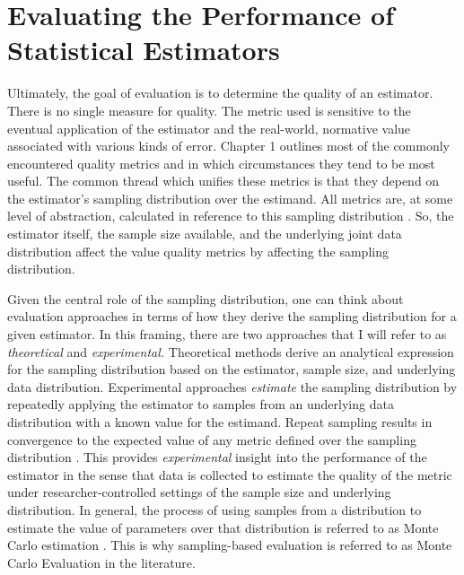 \documentclass[../main.tex]{subfiles}
\begin{document}
\section{Evaluating the Performance of Statistical Estimators}

\vspace{\baselineskip}
Ultimately, the goal of evaluation is to determine the quality of an estimator. There is no single measure for quality. The metric used is sensitive to the eventual application of the estimator and the real-world, normative value associated with various kinds of error. \cite{Bishop2006PatternLearning} Chapter 1 outlines most of the commonly encountered quality metrics and in which circumstances they tend to be most useful. The common thread which unifies these metrics is that they depend on the estimator's sampling distribution over the estimand. All metrics are, at some level of abstraction, calculated in reference to this sampling distribution \cite{Calder1953StatisticalInference}. So, the estimator itself, the sample size available, and the underlying joint data distribution affect the value quality metrics by affecting the sampling distribution.\par


\vspace{\baselineskip}
Given the central role of the sampling distribution, one can think about evaluation approaches in terms of how they derive the sampling distribution for a given estimator. In this framing, there are two approaches that I will refer to as \textit{theoretical} and \textit{experimental.} Theoretical methods derive an analytical expression for the sampling distribution based on the estimator, sample size, and underlying data distribution. Experimental approaches \textit{estimate }the sampling distribution by repeatedly applying the estimator to samples from an underlying data distribution with a known value for the estimand. Repeat sampling results in convergence to the expected value of any metric defined over the sampling distribution \cite{Paxton2001MonteImplementation}. This provides \textit{experimental} insight into the performance of the estimator in the sense that data is collected to estimate the quality of the metric under researcher-controlled settings of the sample size and underlying distribution. In general, the process of using samples from a distribution to estimate the value of parameters over that distribution is referred to as Monte Carlo estimation \cite{Hastings1970MonteApplications}. This is why sampling-based evaluation is referred to as Monte Carlo Evaluation in the literature.\par
\end{document}
